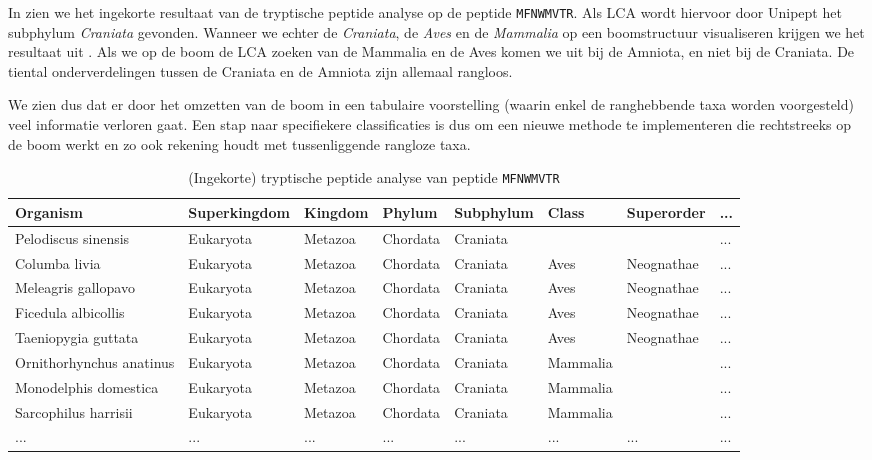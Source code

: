 In  zien we het ingekorte resultaat van de tryptische
peptide analyse op de peptide \texttt{MFNWMVTR}. Als LCA wordt hiervoor door
Unipept het subphylum \textit{Craniata} gevonden. Wanneer we echter de
\textit{Craniata}, de \textit{Aves} en de \textit{Mammalia} op een boomstructuur
visualiseren krijgen we het resultaat uit . Als we 
op de boom de LCA zoeken van de Mammalia en de Aves komen we uit bij de Amniota,
en niet bij de Craniata. De tiental onderverdelingen tussen de Craniata en de
Amniota zijn allemaal rangloos.

We zien dus dat er door het omzetten van de boom in een tabulaire voorstelling
(waarin enkel de ranghebbende taxa worden voorgesteld) veel informatie verloren
gaat. Een stap naar specifiekere classificaties is dus om een nieuwe methode te
implementeren die rechtstreeks op de boom werkt en zo ook rekening houdt met
tussenliggende rangloze taxa.

\begin{table}
	\centering
	
	\caption{(Ingekorte) tryptische peptide analyse van peptide 
	\texttt{MFNWMVTR}}
	\label{tbl:tabelvoorbeeld}
	\scriptsize
	\begin{tabular}{llllllll}
        \toprule
        Organism & Superkingdom & Kingdom & Phylum & Subphylum & Class & 
        Superorder & ... \\
        \midrule
        Pelodiscus sinensis & Eukaryota & Metazoa & Chordata & Craniata &  &  & 
        ... \\
        Columba livia & Eukaryota & Metazoa & Chordata & Craniata & Aves & 
        Neognathae & ... \\
        Meleagris gallopavo & Eukaryota & Metazoa & Chordata & Craniata & Aves 
        & Neognathae & ... \\
        Ficedula albicollis & Eukaryota & Metazoa & Chordata & Craniata & Aves 
        & Neognathae & ... \\
        Taeniopygia guttata & Eukaryota & Metazoa & Chordata & Craniata & Aves 
        & Neognathae & ... \\
        Ornithorhynchus anatinus & Eukaryota & Metazoa & Chordata & Craniata & 
        Mammalia &  & ... \\
        Monodelphis domestica & Eukaryota & Metazoa & Chordata & Craniata & 
        Mammalia &  & ... \\
        Sarcophilus harrisii & Eukaryota & Metazoa & Chordata & Craniata & 
        Mammalia &  & ... \\
        ... & ... & ... & ... & ... & ... & ... & ... \\
        \bottomrule
	\end{tabular}
\end{table}

